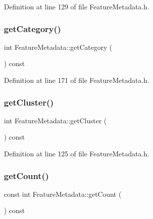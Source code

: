 Definition at line 129 of file Feature\+Metadata.\+h.

\mbox{\label{class_feature_metadata_a8121654a5fc7422adb41cd04ddb0bc72}} 
\subsubsection{\texorpdfstring{get\+Category()}{getCategory()}}
{\footnotesize\ttfamily int Feature\+Metadata\+::get\+Category (\begin{DoxyParamCaption}{ }\end{DoxyParamCaption}) const\hspace{0.3cm}{\ttfamily [inline]}}



Definition at line 171 of file Feature\+Metadata.\+h.

\mbox{\label{class_feature_metadata_a4691adf4f46586826fd8c0667119fc52}} 
\subsubsection{\texorpdfstring{get\+Cluster()}{getCluster()}}
{\footnotesize\ttfamily int Feature\+Metadata\+::get\+Cluster (\begin{DoxyParamCaption}{ }\end{DoxyParamCaption}) const\hspace{0.3cm}{\ttfamily [inline]}}



Definition at line 125 of file Feature\+Metadata.\+h.

\mbox{\label{class_feature_metadata_a52510d086e0b5fdc1b34b718c3bebd14}} 
\subsubsection{\texorpdfstring{get\+Count()}{getCount()}}
{\footnotesize\ttfamily const int Feature\+Metadata\+::get\+Count (\begin{DoxyParamCaption}{ }\end{DoxyParamCaption}) const\hspace{0.3cm}{\ttfamily [inline]}}

